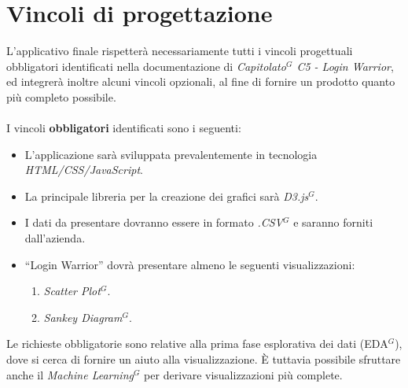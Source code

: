 \section{Vincoli di progettazione}

L'applicativo finale rispetterà necessariamente tutti i vincoli progettuali obbligatori identificati nella documentazione di \textit{Capitolato$^{G}$ C5 - Login Warrior}, ed integrerà inoltre alcuni vincoli opzionali, al fine di fornire un prodotto quanto più completo possibile. \\ \\
I vincoli \textbf{obbligatori} identificati sono i seguenti:
\begin{itemize}
	\item L’applicazione sarà sviluppata prevalentemente in tecnologia \textit{HTML/CSS/JavaScript}.
	\item La principale libreria per la creazione dei grafici sarà \textit{D3.js$^{G}$}.
	\item I dati da presentare dovranno essere in formato \textit{.CSV$^{G}$} e saranno forniti
			dall'azienda.
	\item “Login Warrior” dovrà presentare almeno le seguenti visualizzazioni:
		 \begin{enumerate}
                    \item \textit{Scatter Plot$^{G}$}.
                    \item \textit{Sankey Diagram$^{G}$}.
		\end{enumerate}
\end{itemize}

\noindent
Le richieste obbligatorie sono relative alla prima fase esplorativa dei dati (EDA$^{G}$), dove si cerca di fornire un aiuto alla visualizzazione. È tuttavia possibile sfruttare anche il \textit{Machine Learning$^{G}$} per derivare visualizzazioni più complete.

